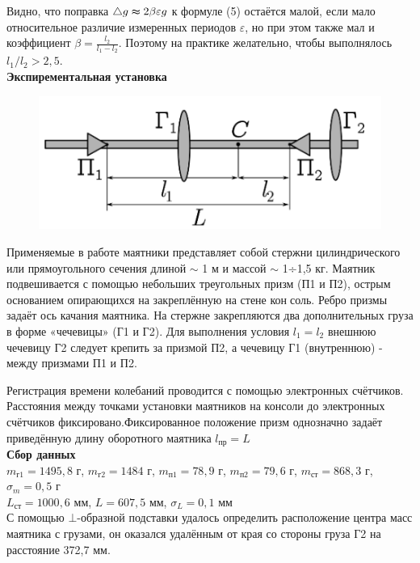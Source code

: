 \documentclass[12pt]{article}
\begin{document}
Видно, что поправка $\triangle g \thickapprox 2\beta\varepsilon g$ к формуле (5) остаётся малой, если мало относительное различие измеренных периодов $\varepsilon$, но при этом также мал и коэффициент $\beta = \frac{l_{2}}{l_{1}-l_{2}}$. Поэтому на практике желательно, чтобы выполнялось $l_{1}/l_{2}>2,5$.\\

\textbf{Экспирементальная установка}

\begin{figure}[h!]
    \centering
    \includegraphics{2022-11-15.png}
\end{figure}
Применяемые в работе маятники представляет собой стержни цилиндрического или прямоугольного сечения длиной $\sim$ 1 м и массой $\sim$ 1÷1,5 кг. Маятник подвешивается с помощью небольших треугольных призм
(П1 и П2), острым основанием опирающихся на закреплённую на стене консоль. Ребро призмы задаёт ось качания маятника. На стержне закрепляются 
два дополнительных груза в форме «чечевицы» (Г1 и Г2). Для выполнения 
условия $l_{1}=l_{2}$ внешнюю чечевицу Г2 следует крепить за призмой П2, а чечевицу Г1 (внутреннюю) - между призмами П1 и П2.

Регистрация времени колебаний проводится с помощью электронных 
счётчиков. Расстояния между точками установки маятников на консоли до 
электронных счётчиков фиксировано.Фиксированное положение призм однозначно задаёт приведённую длину оборотного маятника $l_{\text{пр}} = L$\\

\textbf{\large Сбор данных}\\

$m_{\text{г1}}=1495,8$ г, $m_{\text{г2}}=1484$ г, $m_{\text{п1}}=78,9$ г, $m_{\text{п2}}=79,6$ г, $m_{\text{ст}}=868,3$ г, $\sigma_{m}=0,5$ г\\

$L_{\text{ст}}=1000,6$ мм, $L=607,5$ мм, $\sigma_{L}=0,1$ мм\\

С помощью  $\bot$-образной подставки удалось определить расположение центра масс маятника с грузами, он оказался удалённым от края со стороны груза Г2 на расстояние 372,7 мм.\\
\end{document}
